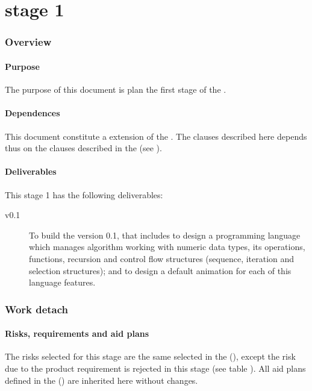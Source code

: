 \documentclass[twocolumn, 9pt]{extarticle}
\begin{document}
\part[\favpl st. 1]{\favpl \\ stage 1}
\label{part:st1-plan}

\section{Overview}

\subsection{Purpose}
The purpose of this document is plan the first stage of the
\favp.

\subsection{Dependences}
This document constitute a extension of the \favpl. The clauses
described here depends thus on the clauses described in the \favpl
(see ).

\subsection{Deliverables}
This stage 1 has the following deliverables:

\begin{description}
\item[\fav v0.1] To build the \fav version 0.1, that includes to design a
  \fav programming language which manages algorithm working with
  numeric data types, its operations, functions, recursion and
  control flow structures (sequence, iteration and selection
  structures); and to design a default animation for each of this
  language features.
\end{description}

\section{Work detach}
\subsection{Risks, requirements and aid plans}
The risks selected for this stage are the same selected in the \favpl
(), except the risk  due to the
product requirement  is rejected in this stage (see
table ). All aid plans defined in the \favpl
() are inherited here without changes.
\end{document}
